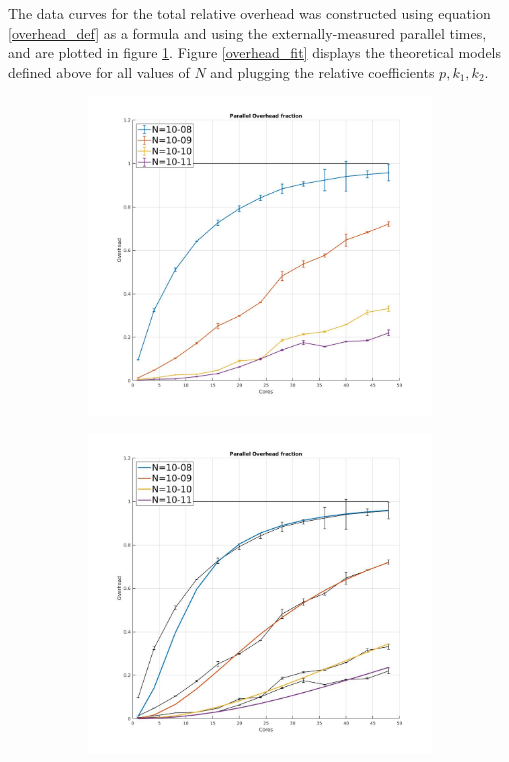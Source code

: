 \documentclass{article}
\begin{document}
The data curves for the total relative overhead was constructed using equation \ref{overhead_def} as a formula and using the externally-measured parallel times, and are plotted in figure \ref{overhead}. Figure \ref{overhead_fit} displays the theoretical models defined above for all values of $N$ and plugging the relative coefficients $p,k_1,k_2$.


\begin{figure}[H]
  \begin{subfigure}[h]{0.5\textwidth}
    \includegraphics[width=\textwidth]{overhead}
    \caption{}
    \label{overhead}
  \end{subfigure}
  \begin{subfigure}[h]{0.5\textwidth}
    \includegraphics[width=\textwidth]{overhead_fit}

\end{subfigure}
\end{figure}
\end{document}

